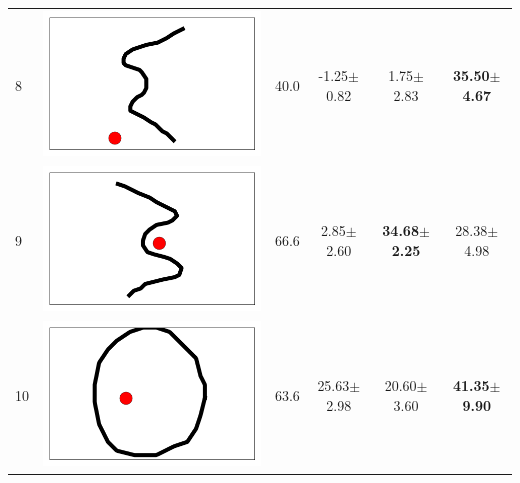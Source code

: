 \begin{table}[t]
{\begin{tabular}{llcccc}
8  &  \includegraphics[height= \shapesize cm]{tps-experiments/shapes/pts_16.png} &        40.0 &           -1.25$\pm$0.82 &            1.75$\pm$2.83 &  \textbf{35.50$\pm$4.67} \\
9  &  \includegraphics[height= \shapesize cm]{tps-experiments/shapes/pts_14.png} &        66.6 &            2.85$\pm$2.60 &  \textbf{34.68$\pm$2.25} &           28.38$\pm$4.98 \\
10 &   \includegraphics[height= \shapesize cm]{tps-experiments/shapes/pts_1.png} &        63.6 &           25.63$\pm$2.98 &           20.60$\pm$3.60 &  \textbf{41.35$\pm$9.90} \\

\end{tabular}}
\end{table}

